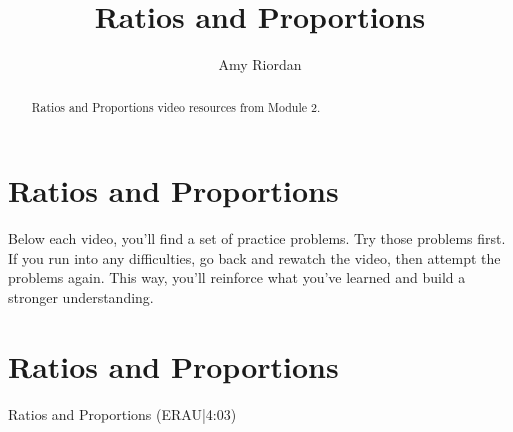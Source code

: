 \documentclass{ximera}
\title{Ratios and Proportions}
\author{Amy Riordan}
\begin{document}
\begin{abstract}
Ratios and Proportions video resources from Module 2.
\end{abstract}
\maketitle

\section*{Ratios and Proportions}

Below each video, you’ll find a set of practice problems. Try those problems first. If you run into any difficulties, go back and rewatch the video, then attempt the problems again. This way, you’ll reinforce what you’ve learned and build a stronger understanding.

\section*{Ratios and Proportions}

Ratios and Proportions (ERAU|4:03)

\end{document}

